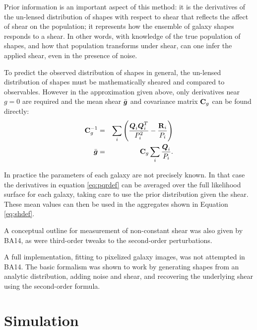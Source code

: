 \documentclass[12pt,preprint]{aastex}
\newcommand{\vecg}{\mbox{\boldmath $g$}}
\newcommand{\vecD}{\mbox{\boldmath $D$}}
\newcommand{\vecQ}{\mbox{\boldmath $Q$}}
\newcommand{\matR}{\mbox{$\bf R$}}
\newcommand{\matC}{\mbox{$\bf C$}}
\newcommand{\bnabg}{ \boldsymbol{\nabla_g}}
\begin{document}
Prior information is an important aspect of this method: it is the derivatives
of the un-lensed distribution of shapes with respect to shear that reflects the
affect of shear on the population; it represents how the ensemble of galaxy
shapes responds to a shear.  In other words, with knowledge of the true
population of shapes, and how that population transforms under shear, can one
infer the applied shear, even in the presence of noise.

To predict the observed distribution of shapes in general, the un-lensed
distribution of shapes must be mathematically sheared and compared to
observables.  However in the approximation given above, only derivatives near
$g=0$ are required and the mean shear $\bar{\vecg}$ and covariance matrix
$\matC_g$ can be found directly:
\begin{eqnarray}
\matC_g^{-1} & = & \sum_i \left(\frac{\vecQ_i \vecQ^T_i}{P_i^2} - \frac{\matR_i}{P_i}\right) \label{eq:cdef} \\
\bar{\vecg} & = &  \matC_g \sum_i \frac{\vecQ_i}{P_i}. \label{eq:shdef}
\end{eqnarray}

In practice the parameters of each galaxy are not precisely known. In that case
the derivatives in equation \ref{eq:pqrdef} can be averaged over the full
likelihood surface for each galaxy, taking care to use the prior
distribution given the shear.  These mean values can then be used in the
aggregates shown in Equation \ref{eq:shdef}.

A conceptual outline for measurement of non-constant shear was also given by
BA14, as were third-order tweaks to the second-order perturbations.

A full implementation, fitting to pixelized galaxy images, was not attempted in
BA14.  The basic formalism was shown to work by generating shapes from
an analytic distribution, adding noise and shear, and recovering the underlying
shear using the second-order formula.

\section{Simulation} \label{sec:sim}
\end{document}
